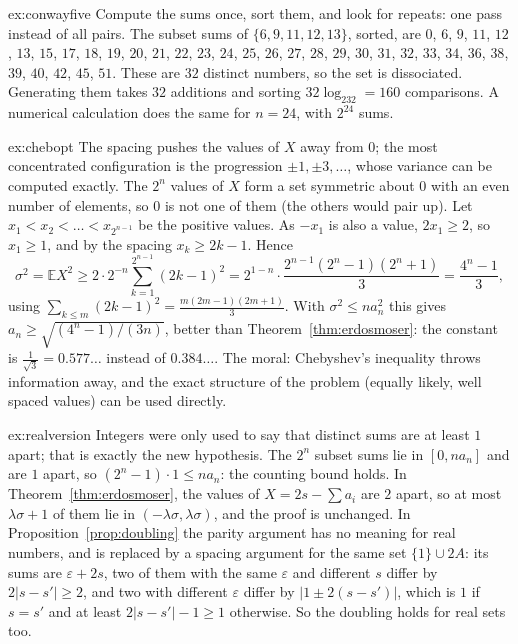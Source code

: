 \begin{solution}{ex:conwayfive}
\idea Compute the sums once, sort them, and look for repeats: one pass instead of all pairs.
\writeup The subset sums of $\{6,9,11,12,13\}$, sorted, are $0$, $6$, $9$, $11$, $12$, $13$, $15$, $17$, $18$, $19$, $20$, $21$, $22$, $23$, $24$, $25$, $26$, $27$, $28$, $29$, $30$, $31$, $32$, $33$, $34$, $36$, $38$, $39$, $40$, $42$, $45$, $51$. These are $32$ distinct numbers, so the set
is dissociated. Generating them takes $32$ additions and sorting $32\log_232=160$ comparisons. A numerical calculation does the same for $n=24$, with
$2^{24}$ sums.
\end{solution}

\begin{solution}{ex:chebopt}
\idea The spacing pushes the values of $X$ away from $0$; the most concentrated configuration is the progression $\pm1,\pm3,\dots$, whose variance can be
computed exactly.
\writeup The $2^n$ values of $X$ form a set symmetric about $0$ with an even number of elements, so $0$ is not one of them (the others would pair up). Let
$x_1<x_2<\dots<x_{2^{n-1}}$ be the positive values. As $-x_1$ is also a value, $2x_1\ge2$, so $x_1\ge1$, and by the spacing $x_k\ge2k-1$. Hence
\[
\sigma^2=\mathbb EX^2\ge2\cdot2^{-n}\sum_{k=1}^{2^{n-1}}(2k-1)^2=2^{1-n}\cdot\frac{2^{n-1}(2^n-1)(2^n+1)}3=\frac{4^n-1}3 ,
\]
using $\sum_{k\le m}(2k-1)^2=\frac{m(2m-1)(2m+1)}3$. With $\sigma^2\le na_n^2$ this gives $a_n\ge\sqrt{(4^n-1)/(3n)}$, better than Theorem~\ref{thm:erdosmoser}: the constant is
$\frac1{\sqrt3}=0.577\ldots$ instead of $0.384\ldots$. The moral: Chebyshev's inequality throws information away, and the exact structure of the problem
(equally likely, well spaced values) can be used directly.
\end{solution}

\begin{solution}{ex:realversion}
\idea Integers were only used to say that distinct sums are at least $1$ apart; that is exactly the new hypothesis.
\writeup The $2^n$ subset sums lie in $[0,na_n]$ and are $1$ apart, so $(2^n-1)\cdot1\le na_n$: the counting bound holds. In Theorem~\ref{thm:erdosmoser}, the values of $X=2s-\sum a_i$ are
$2$ apart, so at most $\lambda\sigma+1$ of them lie in $(-\lambda\sigma,\lambda\sigma)$, and the proof is unchanged. In Proposition~\ref{prop:doubling} the parity argument has no meaning for
real numbers, and is replaced by a spacing argument for the same set $\{1\}\cup2A$: its sums are $\varepsilon+2s$, two of them with the same $\varepsilon$ and different $s$ differ by
$2|s-s'|\ge2$, and two with different $\varepsilon$ differ by $|1\pm2(s-s')|$, which is $1$ if $s=s'$ and at least $2|s-s'|-1\ge1$ otherwise. So the doubling holds for real
sets too.
\end{solution}


